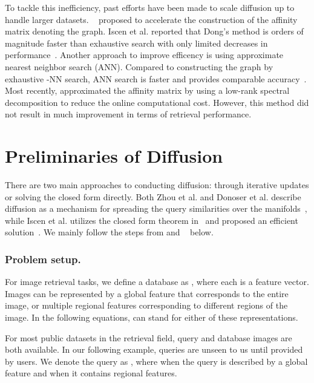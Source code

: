 \documentclass[letterpaper]{article} \usepackage{aaai19}  \usepackage{times}  \usepackage{helvet}  \usepackage{courier}  \usepackage{url}  \usepackage{graphicx}  \frenchspacing  \setlength{\pdfpagewidth}{8.5in}  \setlength{\pdfpageheight}{11in}
\begin{document}
To tackle this inefficiency, past efforts have been made to scale diffusion up to handle larger datasets.
~\cite{dong2011efficient} proposed to accelerate the construction of the affinity matrix denoting the graph.
Iscen et al. reported that Dong's method is orders of magnitude faster than exhaustive search with only limited decreases in performance~\cite{iscen2017efficient}.
Another approach to improve efficency is using approximate nearest neighbor search (ANN).
Compared to constructing the graph by exhaustive -NN search, ANN search is faster and provides comparable accuracy~\cite{jegou2011product,ge2014optimized}.
Most recently, \cite{iscen2018fast} approximated the affinity matrix by using a low-rank spectral decomposition to reduce the online computational cost.
However, this method did not result in much improvement in terms of retrieval performance.


\section{Preliminaries of Diffusion}
\label{sec:preliminaries}

There are two main approaches to conducting diffusion: through iterative updates or solving the closed form directly.
Both Zhou et al. and Donoser et al. describe diffusion as a mechanism for spreading the query similarities over the manifolds~\cite{zhou2004ranking,donoser2013diffusion},
while Iscen et al. utilizes the closed form theorem in~\cite{zhou2004ranking} and proposed an efficient solution~\cite{iscen2017efficient}.
We mainly follow the steps from \cite{zhou2004learning} and ~\cite{iscen2017efficient} below.

\subsubsection{Problem setup.}

For image retrieval tasks, we define a database as , where each  is a feature vector.
Images can be represented by a global feature that corresponds to the entire image, or multiple regional features corresponding to different regions of the image.
In the following equations,  can stand for either of these representations.

For most public datasets in the retrieval field, query and database images are both available.
In our following example, queries are unseen to us until provided by users.
We denote the query as , where  when the query is described by a global feature and  when it contains regional features.
\end{document}
